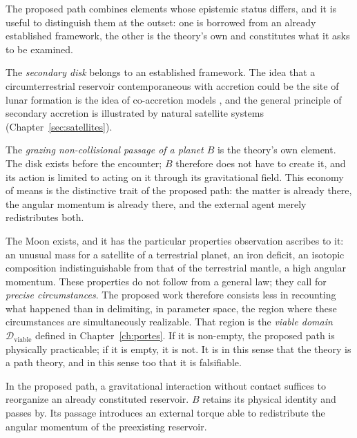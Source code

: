 \documentclass[11pt,a4paper,openany]{report}
\begin{document}
The proposed path combines elements whose epistemic status differs, and it is useful to distinguish
them at the outset: one is borrowed from an already established framework, the other is the theory's
own and constitutes what it asks to be examined.

The \emph{secondary disk} belongs to an established framework. The idea that a circumterrestrial
reservoir contemporaneous with accretion could be the site of lunar formation is the idea of
co-accretion models \cite{Ruskol1960,Weidenschilling1986}, and the general principle of secondary
accretion is illustrated by natural satellite systems (Chapter~\ref{sec:satellites}).

The \emph{grazing non-collisional passage of a planet $B$} is the theory's own element. The disk
exists before the encounter; $B$ therefore does not have to create it, and its action is limited to
acting on it through its gravitational field. This economy of means is the distinctive trait of the
proposed path: the matter is already there, the angular momentum is already there, and the external
agent merely redistributes both.

\begin{ideephys}
The Moon exists, and it has the particular properties observation ascribes to it: an unusual mass
for a satellite of a terrestrial planet, an iron deficit, an isotopic composition indistinguishable
from that of the terrestrial mantle, a high angular momentum. These properties do not follow from a
general law; they call for \emph{precise circumstances}. The proposed work therefore consists less
in recounting what happened than in delimiting, in parameter space, the region where these
circumstances are simultaneously realizable. That region is the \emph{viable domain}
$\mathcal{D}_{\mathrm{viable}}$ defined in Chapter~\ref{ch:portes}. If it is non-empty, the
proposed path is physically practicable; if it is empty, it is not. It is in this sense that the
theory is a path theory, and in this sense too that it is falsifiable.
\end{ideephys}

\begin{lecture}
In the proposed path, a gravitational interaction without contact suffices to reorganize an
already constituted reservoir. $B$ retains its physical identity and passes by. Its passage
introduces an external torque able to redistribute the angular momentum of the preexisting
reservoir.
\end{lecture}
\end{document}
